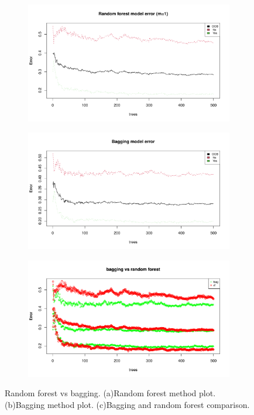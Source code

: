 \begin{figure}[H]
	\centering
	\hfill
	\begin{subfigure}{.5\textwidth}
		\centering
		\includegraphics[width=0.7\linewidth]{ImageFiles/Classification/Trees/best_for_500_plot.pdf}
		\caption{}
		\label{fig:best_for_500_plot}
	\end{subfigure}%
	\hfill
	\begin{subfigure}{.5\textwidth}
		\centering
		\includegraphics[width=0.7\linewidth]{ImageFiles/Classification/Trees/bagg_500_plot.pdf}
		\caption{}
		\label{fig:bagg_500_plot}
	\end{subfigure}
	\begin{subfigure}{.5\textwidth}
		\centering
		\includegraphics[width=0.7\linewidth]{ImageFiles/Classification/Trees/vs_bagg_for_500_plot.pdf}
		\caption{}
		\label{fig:vs_bagg_for_500_plot}
	\end{subfigure}
	\caption{Random forest vs bagging. (a)Random forest method plot. (b)Bagging method plot. (c)Bagging and random forest comparison.}
	\label{fig:RFvsB}
\end{figure}

